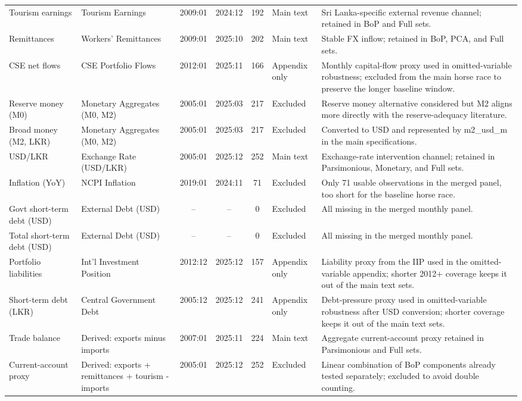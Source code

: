 \begin{longtable}{p{2.8cm}p{2.9cm}cccp{1.9cm}p{6.0cm}}
Tourism earnings & Tourism Earnings & 2009:01 & 2024:12 & 192 & Main text & Sri Lanka-specific external revenue channel; retained in BoP and Full sets. \\
Remittances & Workers' Remittances & 2009:01 & 2025:10 & 202 & Main text & Stable FX inflow; retained in BoP, PCA, and Full sets. \\
CSE net flows & CSE Portfolio Flows & 2012:01 & 2025:11 & 166 & Appendix only & Monthly capital-flow proxy used in omitted-variable robustness; excluded from the main horse race to preserve the longer baseline window. \\
Reserve money (M0) & Monetary Aggregates (M0, M2) & 2005:01 & 2025:03 & 217 & Excluded & Reserve money alternative considered but M2 aligns more directly with the reserve-adequacy literature. \\
Broad money (M2, LKR) & Monetary Aggregates (M0, M2) & 2005:01 & 2025:03 & 217 & Excluded & Converted to USD and represented by m2\_usd\_m in the main specifications. \\
USD/LKR & Exchange Rate (USD/LKR) & 2005:01 & 2025:12 & 252 & Main text & Exchange-rate intervention channel; retained in Parsimonious, Monetary, and Full sets. \\
Inflation (YoY) & NCPI Inflation & 2019:01 & 2024:11 & 71 & Excluded & Only 71 usable observations in the merged panel, too short for the baseline horse race. \\
Govt short-term debt (USD) & External Debt (USD) & -- & -- & 0 & Excluded & All missing in the merged monthly panel. \\
Total short-term debt (USD) & External Debt (USD) & -- & -- & 0 & Excluded & All missing in the merged monthly panel. \\
Portfolio liabilities & Int'l Investment Position & 2012:12 & 2025:12 & 157 & Appendix only & Liability proxy from the IIP used in the omitted-variable appendix; shorter 2012+ coverage keeps it out of the main text sets. \\
Short-term debt (LKR) & Central Government Debt & 2005:12 & 2025:12 & 241 & Appendix only & Debt-pressure proxy used in omitted-variable robustness after USD conversion; shorter coverage keeps it out of the main text sets. \\
Trade balance & Derived: exports minus imports & 2007:01 & 2025:11 & 224 & Main text & Aggregate current-account proxy retained in Parsimonious and Full sets. \\
Current-account proxy & Derived: exports + remittances + tourism - imports & 2005:01 & 2025:12 & 252 & Excluded & Linear combination of BoP components already tested separately; excluded to avoid double counting. \\

\end{longtable}
